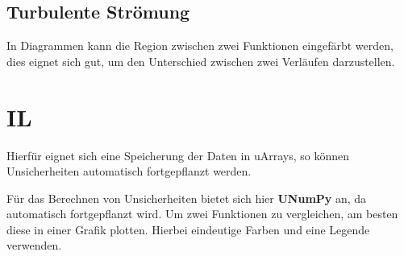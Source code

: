 \documentclass[a4paper,12pt]{article}
\begin{document}
\subsection{Turbulente Strömung}
In Diagrammen kann die Region zwischen zwei Funktionen eingefärbt werden, dies eignet sich gut, um den Unterschied zwischen zwei Verläufen darzustellen.

\section{IL}

\begin{center}
\begin{tcolorbox}[
colback=gray!20,     %
colframe=red,        %
width=0.8\textwidth, %
boxrule=1pt,         %
arc=1mm,             %
]
Hierfür eignet sich eine Speicherung der Daten in uArrays, so können Unsicherheiten automatisch fortgepflanzt werden.
\end{tcolorbox}
\end{center}
Für das Berechnen von Unsicherheiten bietet sich hier \textbf{UNumPy} an, da automatisch fortgepflanzt wird. Um zwei Funktionen zu vergleichen, am besten diese in einer Grafik plotten. Hierbei eindeutige Farben und eine Legende verwenden.

\end{document}
